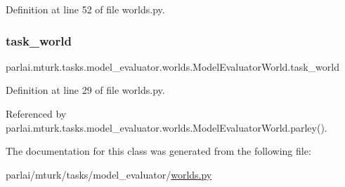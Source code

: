 Definition at line 52 of file worlds.\+py.

\mbox{\label{classparlai_1_1mturk_1_1tasks_1_1model__evaluator_1_1worlds_1_1ModelEvaluatorWorld_ad6bfdd83c43e1eb139f67bdf3816f939}} 
\subsubsection{\texorpdfstring{task\+\_\+world}{task\_world}}
{\footnotesize\ttfamily parlai.\+mturk.\+tasks.\+model\+\_\+evaluator.\+worlds.\+Model\+Evaluator\+World.\+task\+\_\+world}



Definition at line 29 of file worlds.\+py.



Referenced by parlai.\+mturk.\+tasks.\+model\+\_\+evaluator.\+worlds.\+Model\+Evaluator\+World.\+parley().



The documentation for this class was generated from the following file\+:\begin{DoxyCompactItemize}
\item 
parlai/mturk/tasks/model\+\_\+evaluator/\hyperlink{parlai_2mturk_2tasks_2model__evaluator_2worlds_8py}{worlds.\+py}\end{DoxyCompactItemize}
